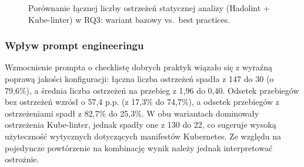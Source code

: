 \begin{figure}[H]
\centering
{}
\caption{Porównanie łącznej liczby ostrzeżeń statycznej analizy (Hadolint + Kube-linter) w RQ3: wariant bazowy vs.\ best practices.}
\label{fig:h3-warnings-comparison}
\end{figure}

\subsubsection{Wpływ prompt engineeringu}

Wzmocnienie prompta o checklistę dobrych praktyk wiązało się z wyraźną poprawą jakości konfiguracji: łączna liczba ostrzeżeń spadła z 147 do 30 (o 79{,}6\%), a średnia liczba ostrzeżeń na przebieg z 1{,}96 do 0{,}40. Odsetek przebiegów bez ostrzeżeń wzrósł o 57{,}4 p.p. (z 17{,}3\% do 74{,}7\%), a odsetek przebiegów z ostrzeżeniami spadł z 82{,}7\% do 25{,}3\%. W obu wariantach dominowały ostrzeżenia Kube-linter, jednak spadły one z 130 do 22, co sugeruje wysoką użyteczność wytycznych dotyczących manifestów Kubernetes. Ze względu na pojedyncze powtórzenie na kombinację wynik należy jednak interpretować ostrożnie.

